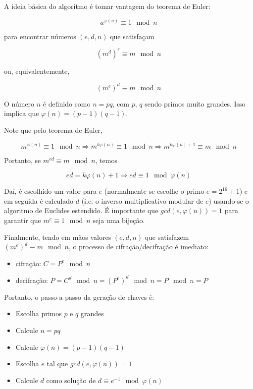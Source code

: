 \documentclass{article}
\begin{document}
A ideia básica do algoritmo é tomar vantagem do teorema de Euler:

\begin{equation*}
    a^{\varphi(n)} \equiv 1 \mod n
\end{equation*}

para encontrar números $(e, d, n)$ que satisfaçam 

\begin{equation*}
    (m^d)^e \equiv m \mod n
\end{equation*}

ou, equivalentemente,

\begin{equation*}
    (m^e)^d \equiv m \mod n
\end{equation*}

O número $n$ é definido como $n = pq$, com $p$, $q$ sendo primos muito grandes. Isso implica que $\varphi(n) = (p-1)(q-1)$.

Note que pelo teorema de Euler,

\begin{equation*}
    m^{\varphi(n)} \equiv 1 \mod n \Rightarrow m^{k\varphi(n)} \equiv 1 \mod n \Rightarrow m^{k\varphi(n) + 1} \equiv m \mod n
\end{equation*}

Portanto, se $m^{ed} \equiv m \mod n$, temos

\begin{equation*}
    ed = k\varphi(n) + 1 \Rightarrow ed \equiv 1 \mod \varphi(n)
\end{equation*}

Daí, é escolhido um valor para $e$ (normalmente se escolhe o primo $e = 2^{16} + 1$) e em seguida é calculado $d$ (i.e. o inverso multiplicativo modular de $e$) usando-se o algoritmo de Euclides estendido. É importante que $gcd(e, \varphi(n)) = 1$ para garantir que $m^e \equiv 1 \mod n$ seja uma bijeção.

Finalmente, tendo em mãos valores $(e, d, n)$ que satisfazem $(m^e)^d \equiv m \mod n$, o processo de cifração/decifração é imediato:

\begin{itemize}
    \item cifração: $C = P^e \mod n$
    \item decifração: $P = C^d \mod n = (P^e)^d \mod n = P \mod n = P$
\end{itemize}

Portanto, o passo-a-passo da geração de chaves é:

\begin{itemize}
    \item Escolha primos $p$ e $q$ grandes
    \item Calcule $n = pq$
    \item Calcule $\varphi(n) = (p-1)(q-1)$
    \item Escolha $e$ tal que $gcd(e, \varphi(n)) = 1$
    \item Calcule $d$ como solução de $d \equiv e^{-1} \mod \varphi(n)$
\end{itemize}
\end{document}
